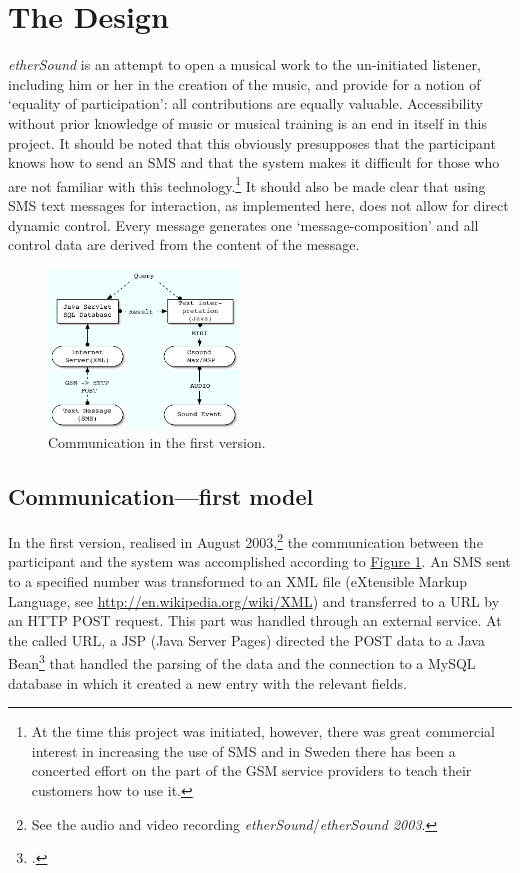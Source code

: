 \section{The Design} 
\emph{etherSound} is an attempt to open a musical work to the un-initiated listener, including him or her in the creation of the music, and provide for a notion of `equality of participation': all contributions are equally valuable. Accessibility without prior knowledge of music or musical training is an end in itself in this project. It should be noted that this obviously presupposes that the participant knows how to send an SMS and that the system makes it difficult for those who are not familiar with this technology.\footnote{At the time this project was initiated, however, there was great commercial interest in increasing the use of SMS and in Sweden there has been a concerted effort on the part of the GSM service providers to teach their customers how to use it.} It should also be made clear that using SMS text messages for interaction, as implemented here, does not allow for direct dynamic control. Every message generates one `message-composition' and all control data are derived from the content of the message.

\begin{figure}[hbp]
\begin{center}
\includegraphics[width=0.45\textwidth]{img/ethsnd/Figure1}
\caption{Communication in the first version.} \label{model1}
\end{center}
\end{figure}

\subsection{Communication---first model}
\label{sec:comm-first}
In the first version, realised in August 2003,\footnote{See the audio   and video recording \emph{etherSound}/\emph{etherSound 2003}.} the communication between the participant and the system was accomplished according to \hyperref[model1]{Figure \ref*{model1}}. An SMS sent to a specified number was transformed to an XML file (eXtensible Markup Language, see \url{http://en.wikipedia.org/wiki/XML}) and transferred to a URL by an HTTP POST request. This part was handled through an external service. At the called URL, a JSP (Java Server Pages)  directed the POST data to a Java Bean\footcite{j2ee} that handled the parsing of the data and the connection to a MySQL database in which it created a new entry with the relevant fields. 

